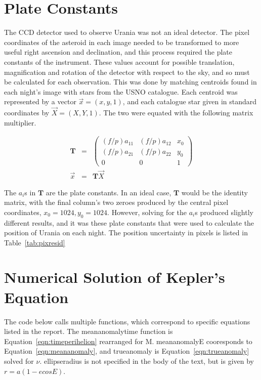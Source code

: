 \documentclass[a4paper,12pt]{article}
\begin{document}
\begin{appendices}
\section{Plate Constants}
\label{app:plate}

The CCD detector used to observe Urania was not an ideal detector. The pixel coordinates of the asteroid in each image needed to be transformed to more useful right ascension and declination, and this process required the plate constants of the instrument. These values account for possible translation, magnification and rotation of the detector with respect to the sky, and so must be calculated for each observation. This was done by matching centroids found in each night's image with stars from the USNO catalogue. Each centroid was represented by a vector $\vec{x} = (x,y,1)$, and each catalogue star given in standard coordinates by $\vec{X} = (X,Y,1)$. The two were equated with the following matrix multiplier.

\begin{eqnarray}
\mathbf{T} &=& \begin{pmatrix}
(f/p)a_{11}& (f/p)a_{12}& x_{0}\\
(f/p)a_{21}& (f/p)a_{22}& y_{0}\\
0& 0& 1
\end{pmatrix}\nonumber\\
\vec{x} &=& \mathbf{T}\vec{X}\nonumber
\label{eqn:transform}
\end{eqnarray}

The $a_{i}$s in $\mathbf{T}$ are the plate constants. In an ideal case, $\mathbf{T}$ would be the identity matrix, with the final column's two zeroes produced by the central pixel coordinates, $x_{0} = 1024, y_{0} = 1024$. However, solving for the $a_{i}$s produced slightly different results, and it was these plate constants that were used to calculate the position of Urania on each night. The position uncertainty in pixels is listed in Table~\ref{tab:pixresid}

\section{Numerical Solution of Kepler's Equation}
\label{app:kepler}

The code below calls multiple functions, which correspond to specific equations listed in the report. The meananomalytime function is Equation~\ref{eqn:timeperihelion} rearranged for M. meananomalyE cooresponds to Equation~\ref{eqn:meananomaly}, and trueanomaly is Equation~\ref{eqn:trueanomaly} solved for $\nu$. ellipseradius is not specified in the body of the text, but is given by $r=a(1-ecosE)$.


\end{appendices}
\end{document}
